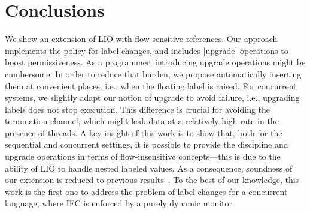 \section{Conclusions}

We show an extension of LIO with flow-sensitive references. Our approach
implements the {\nsu} policy for label changes, and includes |upgrade| operations
to boost permissiveness. As a programmer, introducing upgrade operations might
be cumbersome. In order to reduce that burden, we propose automatically
inserting them at convenient places, i.e., when the floating label is raised. For
concurrent systems, we slightly adapt our notion of upgrade to avoid failure,
i.e., upgrading labels does not stop execution. This difference is crucial
for avoiding the termination channel, which might leak data at a relatively high rate in
the presence of threads. A key insight of this work is to show that, both for the
sequential and concurrent settings, it is possible to provide the {\nsu} discipline
and upgrade operations in terms of flow-insensitive concepts---this is due to 
the ability of LIO to handle nested labeled values. As a consequence,
soundness of our extension is reduced to previous
results~\cite{stefan:lio,stefan:addressing-covert}. To the best of our
knowledge, this work is the first one to address the problem of label changes
for a concurrent language, where IFC is enforced by a purely dynamic monitor.

